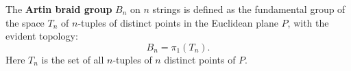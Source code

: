 The \textbf{Artin braid group} $B_n$ on $n$ strings is defined as the fundamental group of the space $T_n$ of $n$-tuples of distinct points in the Euclidean plane $P$, with the evident topology:
$$B_n = \pi_1(T_n).$$
Here $T_n$ is the set of all $n$-tuples of $n$ distinct points of $P$.
